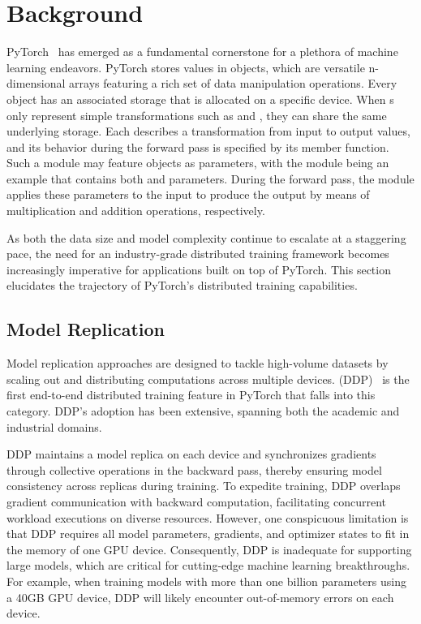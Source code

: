 \section{Background}\label{sec:background}

PyTorch~\cite{pytorch:nips:2019} has emerged as a fundamental cornerstone for a plethora of machine learning endeavors. PyTorch stores values in  objects, which are versatile n-dimensional arrays featuring a rich set of data manipulation operations. Every  object has an associated storage that is allocated on a specific device. When s only represent simple transformations such as  and , they can share the same underlying storage.  Each  describes a transformation from input to output values, and its behavior during the forward pass is specified by its  member function. Such a module may feature  objects as parameters, with the  module being an example that contains both  and  parameters. During the forward pass, the  module applies these parameters to the input to produce the output by means of multiplication and addition operations, respectively.

As both the data size and model complexity continue to escalate at a staggering pace, the need for an industry-grade distributed training framework becomes increasingly imperative for applications built on top of PyTorch. This section elucidates the trajectory of PyTorch's distributed training capabilities.



\subsection{Model Replication}

Model replication approaches are designed to tackle high-volume datasets by scaling out and distributing computations across multiple devices.  (DDP)~\cite{ddp} is the first end-to-end distributed training feature in PyTorch that falls into this category. DDP's adoption has been extensive, spanning both the academic and industrial domains. 

DDP maintains a model replica on each device and synchronizes gradients through collective  operations in the backward pass, thereby ensuring model consistency across replicas during training. To expedite training, DDP overlaps gradient communication with backward computation, facilitating concurrent workload executions on diverse resources. However, one conspicuous limitation is that DDP requires all model parameters, gradients, and optimizer states to fit in the memory of one GPU device. Consequently, DDP is inadequate for supporting large models, which are critical for cutting-edge machine learning breakthroughs. For example, when training models with more than one billion parameters using a 40GB GPU device, DDP will likely encounter out-of-memory errors on each device.


